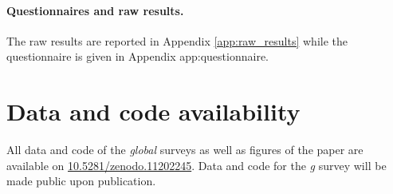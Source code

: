 \documentclass[12pt,english]{article}
\begin{document}
\begin{bibunit}
\begin{small}
\paragraph{\small Questionnaires and raw results.} %
The raw results are reported in Appendix \ref{app:raw_results} while the questionnaire is given in Appendix {app:questionnaire}. 


\section*{\normalsize Data and code availability}

All data and code of the \textit{global} surveys as well as figures of the paper are available on \href{https://zenodo.org/doi/10.5281/zenodo.11202245}{10.5281/zenodo.11202245}. %
Data and code for the \textit{g} survey will be made public upon publication. %


\end{small}
\end{bibunit}
\end{document}
